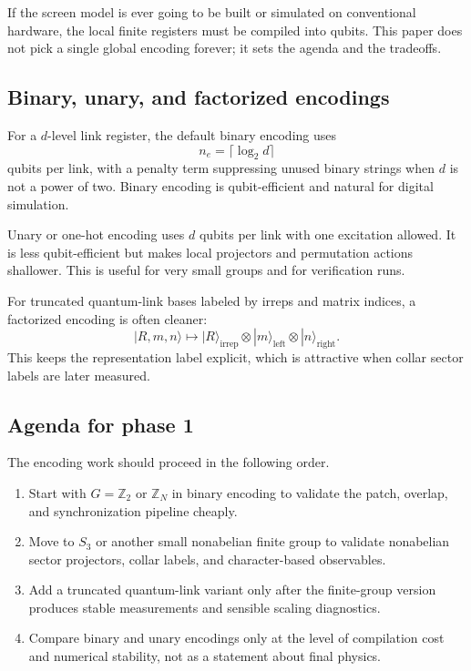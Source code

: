 \documentclass[11pt]{article}
\begin{document}
If the screen model is ever going to be built or simulated on conventional hardware, the
local finite registers must be compiled into qubits. This paper does not pick a single global
encoding forever; it sets the agenda and the tradeoffs.

\subsection{Binary, unary, and factorized encodings}

For a $d$-level link register, the default binary encoding uses
\begin{equation}
 n_e = \lceil \log_2 d\rceil
\end{equation}
qubits per link, with a penalty term suppressing unused binary strings when $d$ is not a
power of two. Binary encoding is qubit-efficient and natural for digital simulation.

Unary or one-hot encoding uses $d$ qubits per link with one excitation allowed. It is less
qubit-efficient but makes local projectors and permutation actions shallower. This is useful
for very small groups and for verification runs.

For truncated quantum-link bases labeled by irreps and matrix indices, a factorized encoding
is often cleaner:
\begin{equation}
|R,m,n\rangle \longmapsto |R\rangle_{\mathrm{irrep}}\otimes |m\rangle_{\mathrm{left}}
\otimes |n\rangle_{\mathrm{right}}.
\end{equation}
This keeps the representation label explicit, which is attractive when collar sector labels
are later measured.

\subsection{Agenda for phase 1}

The encoding work should proceed in the following order.
\begin{enumerate}[leftmargin=2em]
\item Start with $G=\mathbb Z_2$ or $\mathbb Z_N$ in binary encoding to validate the patch,
overlap, and synchronization pipeline cheaply.
\item Move to $S_3$ or another small nonabelian finite group to validate nonabelian sector
projectors, collar labels, and character-based observables.
\item Add a truncated quantum-link variant only after the finite-group version produces stable
measurements and sensible scaling diagnostics.
\item Compare binary and unary encodings only at the level of compilation cost and numerical
stability, not as a statement about final physics.
\end{enumerate}
\end{document}
